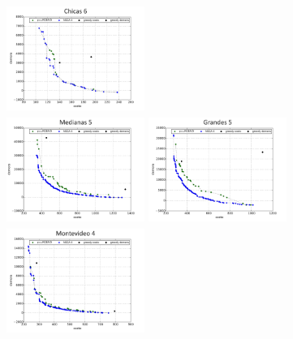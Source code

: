 \begin{columns}[t]
\centering
\includegraphics[width=4.5cm,height=3.5cm]{./evaluacion_experimental/fp_comparacion/Ch_6_1.png}\\
\includegraphics[width=4.5cm,height=3.5cm]{./evaluacion_experimental/fp_comparacion/Me_5_3.png}
\centering
\includegraphics[width=4.5cm,height=3.5cm]{./evaluacion_experimental/fp_comparacion/Gr_5_2.png}\\
\includegraphics[width=4.5cm,height=3.5cm]{./evaluacion_experimental/fp_comparacion/Mo_4_3.png}
\end{columns}